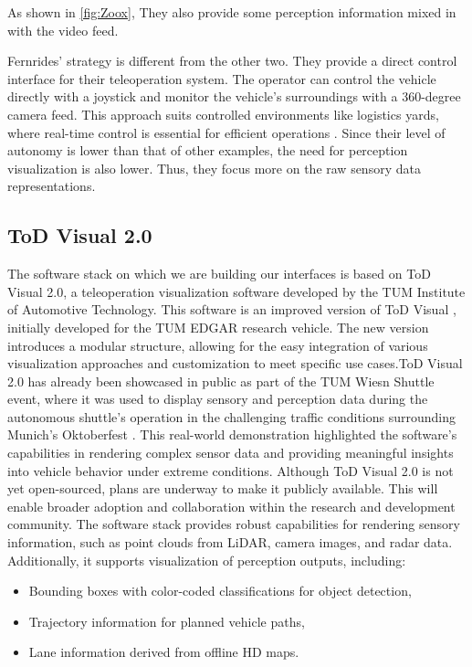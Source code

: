 As shown in \ref{fig:Zoox}, They also provide some perception information mixed in with the video feed.

Fernrides' strategy is different from the other two. They provide a direct
control interface for their teleoperation system. The operator can control the vehicle directly with a joystick and monitor the vehicle's surroundings with a 360-degree camera feed. This approach suits controlled environments like logistics yards, where real-time control is essential for efficient operations \cite{fernride2023}. Since their level of autonomy is lower than that of other examples, the need for perception visualization is also lower. Thus, they focus more on the raw sensory data representations.

\subsection{ToD Visual 2.0}\label{subsection:todvisual}
The software stack on which we are building our interfaces is based on ToD Visual 2.0, a teleoperation visualization software developed by the TUM Institute of Automotive Technology. This software is an improved version of ToD Visual \cite{Schimpe}, initially developed for the TUM EDGAR research vehicle. The new version introduces a modular structure, allowing for the easy integration of various visualization approaches and customization to meet specific use cases.ToD Visual 2.0 has already been showcased in public as part of the TUM Wiesn Shuttle event, where it was used to display sensory and perception data during the autonomous shuttle's operation in the challenging traffic conditions surrounding Munich's Oktoberfest \cite{adac2024wiesn, tum2024wiesn}. This real-world demonstration highlighted the software's capabilities in rendering complex sensor data and providing meaningful insights into vehicle behavior under extreme conditions. Although ToD Visual 2.0 is not yet open-sourced, plans are underway to make it publicly available. This will enable broader adoption and collaboration within the research and development community. The software stack provides robust capabilities for rendering sensory information, such as point clouds from LiDAR, camera images, and radar data. Additionally, it supports visualization of perception outputs, including:
\begin{itemize}
    \item Bounding boxes with color-coded classifications for object detection,
    \item Trajectory information for planned vehicle paths,
    \item Lane information derived from offline HD maps.
\end{itemize}

